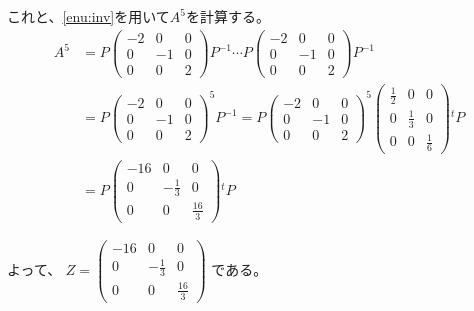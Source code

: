 \documentclass[12pt,b5paper]{ltjsarticle}
\begin{document}
\begin{description}
\begin{enumerate}
             これと、\ref{enu:inv}を用いて$A^{5}$を計算する。
             \begin{align}
              A^{5}
              &=P
               \begin{pmatrix}
                -2 & 0 & 0 \\
                0 & -1 & 0 \\
                0 & 0 & 2
               \end{pmatrix}
               P^{-1}
               \cdots
               P
               \begin{pmatrix}
                -2 & 0 & 0 \\
                0 & -1 & 0 \\
                0 & 0 & 2
               \end{pmatrix}
               P^{-1}\\
               &=P
               \begin{pmatrix}
                -2 & 0 & 0 \\
                0 & -1 & 0 \\
                0 & 0 & 2
               \end{pmatrix}^{5}
               P^{-1}
              =
              P
              \begin{pmatrix}
                -2 & 0 & 0 \\
                0 & -1 & 0 \\
                0 & 0 & 2
              \end{pmatrix}^{5}
              \begin{pmatrix}
               \frac{1}{2} & 0 & 0 \\
               0 & \frac{1}{3} & 0 \\
               0 & 0 & \frac{1}{6}
              \end{pmatrix}
              {}^{t}\!P\\
              &=
              P
              \begin{pmatrix}
                -16 & 0 & 0 \\
                0 & -\frac{1}{3} & 0 \\
                0 & 0 & \frac{16}{3}
              \end{pmatrix}
              {}^{t}\!P
             \end{align}
       \end{enumerate}

        よって、
        $Z=\begin{pmatrix}
                -16 & 0 & 0 \\
                0 & -\frac{1}{3} & 0 \\
                0 & 0 & \frac{16}{3}
              \end{pmatrix}$
             である。


\end{description}
\end{document}
